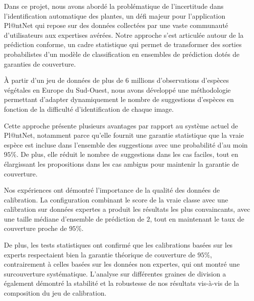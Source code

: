 \documentclass[a4paper,12pt]{article}
\begin{document}
Dans ce projet, nous avons abordé la problématique de l'incertitude dans l'identification automatique des plantes, un défi majeur pour l'application Pl@ntNet qui repose sur des données collectées par une vaste communauté d'utilisateurs aux expertises avérées. Notre approche s'est articulée autour de la prédiction conforme, un cadre statistique qui permet de transformer des sorties probabilistes d'un modèle de classification en ensembles de prédiction dotés de garanties de couverture.

\vspace{0.2cm}

À partir d'un jeu de données de plus de $6$ millions d'observations d'espèces végétales en Europe du Sud-Ouest, nous avons développé une méthodologie permettant d'adapter dynamiquement le nombre de suggestions d'espèces en fonction de la difficulté d'identification de chaque image. 

\vspace{0.2cm}

Cette approche présente plusieurs avantages par rapport au système actuel de Pl@ntNet, notamment parce qu'elle fournit une garantie statistique que la vraie espèce est incluse dans l'ensemble des suggestions avec une probabilité d'au moin $95\%$. De plus, elle réduit le nombre de suggestions dans les cas faciles, tout en élargissant les propositions dans les cas ambigus pour maintenir la garantie de couverture.

\vspace{0.2cm}

Nos expériences ont démontré l'importance de la qualité des données de calibration. La configuration combinant le score de la vraie classe avec une calibration sur données expertes a produit les résultats les plus convaincants, avec une taille médiane d'ensemble de prédiction de $2$, tout en maintenant le taux de couverture proche de $95\%$.

\vspace{0.2cm}

De plus, les tests statistiques ont confirmé que les calibrations basées sur les experts respectaient bien la garantie théorique de couverture de $95\%$, contrairement à celles basées sur les données non expertes, qui ont montré une surcouverture systématique. L’analyse sur différentes graines de division a également démontré la stabilité et la robustesse de nos résultats vis-à-vis de la composition du jeu de calibration.

\vspace{0.2cm}
\end{document}
